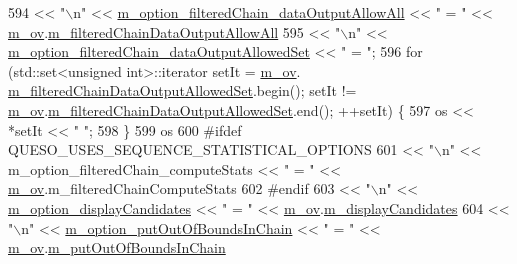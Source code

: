 \begin{DoxyCode}
594      << \textcolor{stringliteral}{"\(\backslash\)n"} << \hyperlink{class_q_u_e_s_o_1_1_metropolis_hastings_s_g_options_a7317db52b0866c8895ad1a16d4a4b337}{m\_option\_filteredChain\_dataOutputAllowAll}         
        << \textcolor{stringliteral}{" = "} << \hyperlink{class_q_u_e_s_o_1_1_metropolis_hastings_s_g_options_a9d4792d9fc2dc5439b8ab489b0c236eb}{m\_ov}.\hyperlink{class_q_u_e_s_o_1_1_mh_options_values_a249e8720b4570d5f4e6504a29a84ac04}{m\_filteredChainDataOutputAllowAll}
595      << \textcolor{stringliteral}{"\(\backslash\)n"} << \hyperlink{class_q_u_e_s_o_1_1_metropolis_hastings_s_g_options_a361df3110aea27f35465dedac372a90f}{m\_option\_filteredChain\_dataOutputAllowedSet} << \textcolor{stringliteral}{"
       = "};
596   \textcolor{keywordflow}{for} (std::set<unsigned int>::iterator setIt = \hyperlink{class_q_u_e_s_o_1_1_metropolis_hastings_s_g_options_a9d4792d9fc2dc5439b8ab489b0c236eb}{m\_ov}.
      \hyperlink{class_q_u_e_s_o_1_1_mh_options_values_ab465e2184857848c2276578b2b08baab}{m\_filteredChainDataOutputAllowedSet}.begin(); setIt != 
      \hyperlink{class_q_u_e_s_o_1_1_metropolis_hastings_s_g_options_a9d4792d9fc2dc5439b8ab489b0c236eb}{m\_ov}.\hyperlink{class_q_u_e_s_o_1_1_mh_options_values_ab465e2184857848c2276578b2b08baab}{m\_filteredChainDataOutputAllowedSet}.end(); ++setIt) \{
597     os << *setIt << \textcolor{stringliteral}{" "};
598   \}
599   os
600 \textcolor{preprocessor}{#ifdef QUESO\_USES\_SEQUENCE\_STATISTICAL\_OPTIONS}
601 \textcolor{preprocessor}{}     << \textcolor{stringliteral}{"\(\backslash\)n"} << m\_option\_filteredChain\_computeStats                 << \textcolor{stringliteral}{" = "} << 
      \hyperlink{class_q_u_e_s_o_1_1_metropolis_hastings_s_g_options_a9d4792d9fc2dc5439b8ab489b0c236eb}{m\_ov}.m\_filteredChainComputeStats
602 \textcolor{preprocessor}{#endif}
603 \textcolor{preprocessor}{}     << \textcolor{stringliteral}{"\(\backslash\)n"} << \hyperlink{class_q_u_e_s_o_1_1_metropolis_hastings_s_g_options_a7881fafcf3caa7bf33d20ff0a7576944}{m\_option\_displayCandidates}                          << \textcolor{stringliteral}{" = "} << 
      \hyperlink{class_q_u_e_s_o_1_1_metropolis_hastings_s_g_options_a9d4792d9fc2dc5439b8ab489b0c236eb}{m\_ov}.\hyperlink{class_q_u_e_s_o_1_1_mh_options_values_a1df386cecfd87745e4d8adfb472d3443}{m\_displayCandidates}
604      << \textcolor{stringliteral}{"\(\backslash\)n"} << \hyperlink{class_q_u_e_s_o_1_1_metropolis_hastings_s_g_options_a6d1856b0435c6dfcac6b75ec36829b47}{m\_option\_putOutOfBoundsInChain}                      << \textcolor{stringliteral}{" = "} 
      << \hyperlink{class_q_u_e_s_o_1_1_metropolis_hastings_s_g_options_a9d4792d9fc2dc5439b8ab489b0c236eb}{m\_ov}.\hyperlink{class_q_u_e_s_o_1_1_mh_options_values_a6500d388ce724964ed858174a454177a}{m\_putOutOfBoundsInChain}

\end{DoxyCode}
